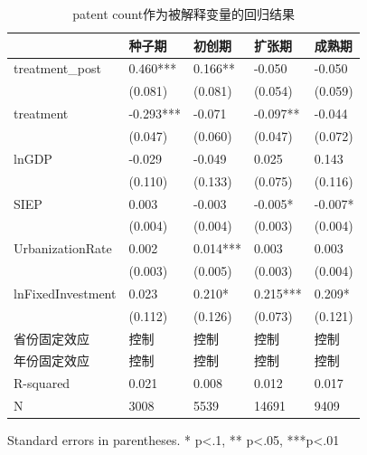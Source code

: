 \begin{table}
\caption{patent count作为被解释变量的回归结果}
\label{}
\begin{center}
\begin{tabular}{lllll}
\hline
                  & 种子期       & 初创期      & 扩张期      & 成熟期      \\
\hline
treatment\_post   & 0.460***  & 0.166**  & -0.050   & -0.050   \\
                  & (0.081)   & (0.081)  & (0.054)  & (0.059)  \\
treatment         & -0.293*** & -0.071   & -0.097** & -0.044   \\
                  & (0.047)   & (0.060)  & (0.047)  & (0.072)  \\
lnGDP             & -0.029    & -0.049   & 0.025    & 0.143    \\
                  & (0.110)   & (0.133)  & (0.075)  & (0.116)  \\
SIEP            & 0.003     & -0.003   & -0.005*  & -0.007*  \\
                  & (0.004)   & (0.004)  & (0.003)  & (0.004)  \\
UrbanizationRate              & 0.002     & 0.014*** & 0.003    & 0.003    \\
                  & (0.003)   & (0.005)  & (0.003)  & (0.004)  \\
lnFixedInvestment & 0.023     & 0.210*   & 0.215*** & 0.209*   \\
                  & (0.112)   & (0.126)  & (0.073)  & (0.121)  \\
省份固定效应  & 控制 & 控制 & 控制 & 控制  \\ 
 年份固定效应  & 控制 & 控制 & 控制 & 控制  \\ 
\hline

R-squared         & 0.021     & 0.008    & 0.012    & 0.017    \\
N                 & 3008      & 5539     & 14691    & 9409     \\
\hline
\end{tabular}
\end{center}
\end{table}
\bigskip
Standard errors in parentheses. \newline 
* p<.1, ** p<.05, ***p<.01

